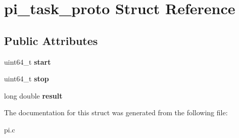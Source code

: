 \hypertarget{structpi__task__proto}{}\section{pi\+\_\+task\+\_\+proto Struct Reference}
\label{structpi__task__proto}
\subsection*{Public Attributes}
\begin{DoxyCompactItemize}
\item 
\mbox{\label{structpi__task__proto_aadb2bba08418caac68c3efe5c79e36dc}} 
uint64\+\_\+t {\bfseries start}
\item 
\mbox{\label{structpi__task__proto_a910cb8b0c7744d3853d557fc452e74b5}} 
uint64\+\_\+t {\bfseries stop}
\item 
\mbox{\label{structpi__task__proto_a454bf3c816087b8e0a143b8bbf9c682b}} 
long double {\bfseries result}
\end{DoxyCompactItemize}


The documentation for this struct was generated from the following file\+:\begin{DoxyCompactItemize}
\item 
pi.\+c\end{DoxyCompactItemize}
